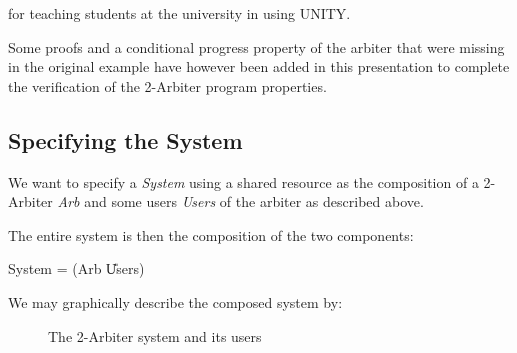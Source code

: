 for teaching students at the university in using UNITY.

\bigskip
Some proofs and a conditional progress property of the arbiter that were
missing in the original example have however been added in this presentation to
complete the verification of the 2-Arbiter program properties.


\subsection{Specifying the System}

We want to specify a {\it System} using a shared resource as the composition 
of a 2-Arbiter {\it Arb} and some users {\it Users} of the arbiter as described
above.

The entire system is then the composition of the two components:

{\it
\begin{center}
     System = (Arb \U Users)
\end{center}
}

We may graphically describe the composed system by:

\begin{figure}[h]

\centerline{\hbox{}}

\vspace{3mm}
\caption[A 2-Arbiter system]{The 2-Arbiter system and its users}
\end{figure}


